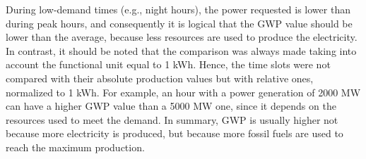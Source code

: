 {{{{{During low-demand times (e.g., night hours), the power requested is lower than during peak hours, and consequently it is logical that the GWP value should be lower than the average, because less resources are used to produce the electricity. In contrast, it should be noted that the comparison was always made taking into account the functional unit equal to 1 kWh. Hence, the time slots were not compared with their  absolute production values but with relative ones, normalized to 1 kWh. For example, an hour with a power generation of 2000 MW can have a higher GWP value than a 5000 MW one, since it depends on the resources used to meet the demand. In summary, GWP is usually higher not because more electricity is produced, but because more fossil fuels are used to reach the maximum production.


\begin{landscape}
\vspace*{\fill}
\begin{table}[htbp]
\centering
\caption{Summary of results between LCA and peak-hourly life cycle assessment (PH-LCA).}
\label{summaryfindings}
\end{table}
\end{landscape}}}}}}
